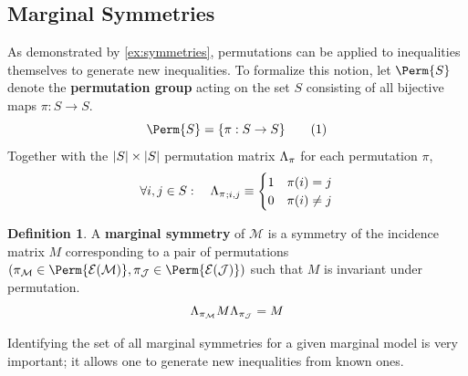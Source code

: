 \documentclass[aps, 10pt, english, twoside, pra, nofootinbib, longbibliography]{revtex4-1}
\theoremstyle{plain}
\theoremstyle{definition}
\newtheorem{definition}[theorem]{Definition}
\theoremstyle{remark}
\newcommand{\mscenario}{\mathcal{M}}
\newcommand{\jointvar}{\mathcal{J}}
\newcommand{\term}[1]{\textcolor{Mahogany}{\textbf{#1}}}
\newcommand{\tcdot}{} %
\newcommand{\PermM}[1]{\La_{#1}} %
\newcommand{\Events}[1]{\s{E}\br{#1}} %
\begin{document}
    \subsection{Marginal Symmetries}
    As demonstrated by \cref{ex:symmetries}, permutations can be applied to inequalities themselves to generate new inequalities. To formalize this notion, let $\Perm{S}$ denote the \term{permutation group} acting on the set $S$ consisting of all bijective maps $\pi : S \to S$.
    \[ \Perm{S} = \bc{\pi : S \to S} \eq \label{eq:permutation_group_def}\]
    Together with the $\abs{S}\times\abs{S}$ permutation matrix $\PermM{\pi}$ for each permutation $\pi$,
    \[ \forall i,j \in S : \quad {\PermM{\pi}}_{;i,j} \defined \begin{cases}
        1 & \pi\br{i} = j\\
        0 & \pi\br{i} \neq j\\
    \end{cases} \]

    \begin{definition}
        A \term{marginal symmetry} of $\mscenario$ is a symmetry of the incidence matrix $M$ corresponding to a pair of permutations $\br{\pi_\mscenario \in \Perm{\Events{\mscenario}}, \pi_\jointvar\in \Perm{\Events{\jointvar}}}$ such that $M$ is invariant under permutation.
        \[ \PermM{\pi_\mscenario} \tcdot M \tcdot \PermM{\pi_\jointvar} = M \]
    \end{definition}

    Identifying the set of all marginal symmetries for a given marginal model is very important; it allows one to generate new inequalities from known ones.
\end{document}
